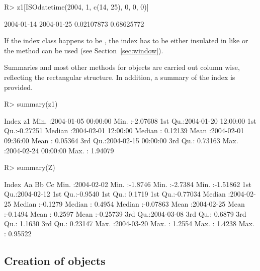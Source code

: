 \documentclass[article,nojss]{jss}
\begin{document}
\begin{Schunk}
\begin{Sinput}
R> z1[ISOdatetime(2004, 1, c(14, 25), 0, 0, 0)]
\end{Sinput}
\begin{Soutput}
2004-01-14 2004-01-25 
0.02107873 0.68625772 
\end{Soutput}
\end{Schunk}

If the index class happens to be , the index has to be either insulated in 
like  or the   method can be used (see Section~\ref{sec:window}).

Summaries and most other methods for  objects are carried out
column wise, reflecting the rectangular structure. In addition,
a summary of the index is provided.

\begin{Schunk}
\begin{Sinput}
R> summary(z1)
\end{Sinput}
\begin{Soutput}
     Index                           z1          
 Min.   :2004-01-05 00:00:00   Min.   :-2.07608  
 1st Qu.:2004-01-20 12:00:00   1st Qu.:-0.27251  
 Median :2004-02-01 12:00:00   Median : 0.12139  
 Mean   :2004-02-01 09:36:00   Mean   : 0.05364  
 3rd Qu.:2004-02-15 00:00:00   3rd Qu.: 0.73163  
 Max.   :2004-02-24 00:00:00   Max.   : 1.94079  
\end{Soutput}
\begin{Sinput}
R> summary(Z)
\end{Sinput}
\begin{Soutput}
     Index                  Aa                Bb                Cc          
 Min.   :2004-02-02   Min.   :-1.8746   Min.   :-2.7384   Min.   :-1.51862  
 1st Qu.:2004-02-12   1st Qu.:-0.9540   1st Qu.: 0.1719   1st Qu.:-0.77034  
 Median :2004-02-25   Median :-0.1279   Median : 0.4954   Median :-0.07863  
 Mean   :2004-02-25   Mean   :-0.1494   Mean   : 0.2597   Mean   :-0.25739  
 3rd Qu.:2004-03-08   3rd Qu.: 0.6879   3rd Qu.: 1.1630   3rd Qu.: 0.23147  
 Max.   :2004-03-20   Max.   : 1.2554   Max.   : 1.4238   Max.   : 0.95522  
\end{Soutput}
\end{Schunk}


\subsection[Creation of "zooreg" objects]{Creation of  objects}
\label{sec:zooreg}
\end{document}
